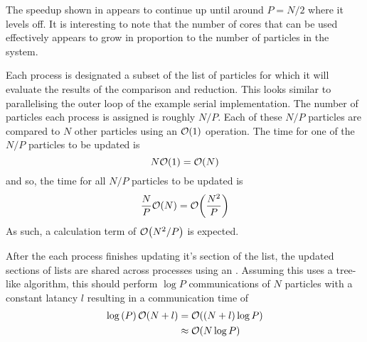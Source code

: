 %

%
%
\begin{figure}[!h]
    
    \caption{
        \vZeroSpeedupCaption
            {\replicateddata{}}
            {\pairoperation{}}
    }
    \label{fig:v0_replicated_data_pair_operation_speedups}
\end{figure}


\vZeroSpeedupExplanation
    {}
    {\replicateddata{}}
    {\pairoperation{}}

The speedup shown in 
appears to continue up until around $P = N/2$ where it levels
off.
%
It is interesting to note that the number of cores that can be
used effectively appears to grow in proportion to the number of particles
in the system.

%
Each process is designated a subset of the list of particles for which
it will evaluate the results of the comparison and reduction.
%
This looks similar to parallelising the outer loop of the example
serial implementation.
%
The number of particles each process is assigned is roughly $N/P$.
%
Each of these $N/P$ particles are compared to $N$ other particles
using an $\mathcal{O}{\left({ 1 }\right)}$ operation.
%
The time for one of the $N/P$ particles to be updated is
\begin{equation}
    N\mathcal{O}{\left({ 1 }\right)} = \mathcal{O}{\left({ N }\right)}
\end  {equation}
and so, the time for all $N/P$ particles to be updated is
\begin{equation}
    \frac{N}{P}\mathcal{O}{\left({ N }\right)} = \mathcal{O}{\left({ \frac{N^2}{P} }\right)}
\end  {equation}
As such, a calculation term of $\mathcal{O}{\left({ N^2/P }\right)}$ is expected.

%
After the each process finishes updating it's section of the list,
the updated sections of lists are shared across processes using
an \mpiallgatherv{}.
Assuming this uses a tree-like algorithm, this should perform
$\log{P}$ communications of $N$ particles with a constant latancy $l$
resulting in a communication time of
\begin{equation}
    \begin{split}
        \log{(P)}\,\mathcal{O}{\left({ N + l }\right)}
            &= \mathcal{O}{\left({ (N+l)\log{P} }\right)} \\
            &\approx{} \mathcal{O}{\left({ N\log{P} }\right)}
    \end{split}
\end{equation}

